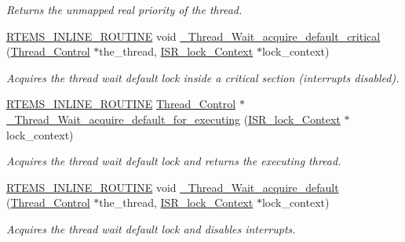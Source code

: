 \begin{DoxyCompactItemize}
\begin{DoxyCompactList}\small\item\em Returns the unmapped real priority of the thread. \end{DoxyCompactList}\item 
\mbox{\hyperlink{group__RTEMSScoreBaseDefs_gac216239df231d5dbd15e3520b0b9313f}{R\+T\+E\+M\+S\+\_\+\+I\+N\+L\+I\+N\+E\+\_\+\+R\+O\+U\+T\+I\+NE}} void \mbox{\hyperlink{group__RTEMSScoreThread_gafbc47e5ce486029f2311242f2303c66d}{\+\_\+\+Thread\+\_\+\+Wait\+\_\+acquire\+\_\+default\+\_\+critical}} (\mbox{\hyperlink{struct__Thread__Control}{Thread\+\_\+\+Control}} $\ast$the\+\_\+thread, \mbox{\hyperlink{structISR__lock__Context}{I\+S\+R\+\_\+lock\+\_\+\+Context}} $\ast$lock\+\_\+context)
\begin{DoxyCompactList}\small\item\em Acquires the thread wait default lock inside a critical section (interrupts disabled). \end{DoxyCompactList}\item 
\mbox{\hyperlink{group__RTEMSScoreBaseDefs_gac216239df231d5dbd15e3520b0b9313f}{R\+T\+E\+M\+S\+\_\+\+I\+N\+L\+I\+N\+E\+\_\+\+R\+O\+U\+T\+I\+NE}} \mbox{\hyperlink{struct__Thread__Control}{Thread\+\_\+\+Control}} $\ast$ \mbox{\hyperlink{group__RTEMSScoreThread_ga37b50dcc140d5c4e34e4e063339baee5}{\+\_\+\+Thread\+\_\+\+Wait\+\_\+acquire\+\_\+default\+\_\+for\+\_\+executing}} (\mbox{\hyperlink{structISR__lock__Context}{I\+S\+R\+\_\+lock\+\_\+\+Context}} $\ast$lock\+\_\+context)
\begin{DoxyCompactList}\small\item\em Acquires the thread wait default lock and returns the executing thread. \end{DoxyCompactList}\item 
\mbox{\hyperlink{group__RTEMSScoreBaseDefs_gac216239df231d5dbd15e3520b0b9313f}{R\+T\+E\+M\+S\+\_\+\+I\+N\+L\+I\+N\+E\+\_\+\+R\+O\+U\+T\+I\+NE}} void \mbox{\hyperlink{group__RTEMSScoreThread_gafed63d230bdeca7d53b9b9aa2b0abbcc}{\+\_\+\+Thread\+\_\+\+Wait\+\_\+acquire\+\_\+default}} (\mbox{\hyperlink{struct__Thread__Control}{Thread\+\_\+\+Control}} $\ast$the\+\_\+thread, \mbox{\hyperlink{structISR__lock__Context}{I\+S\+R\+\_\+lock\+\_\+\+Context}} $\ast$lock\+\_\+context)
\begin{DoxyCompactList}\small\item\em Acquires the thread wait default lock and disables interrupts. \end{DoxyCompactList}\item 

\end{DoxyCompactItemize}
